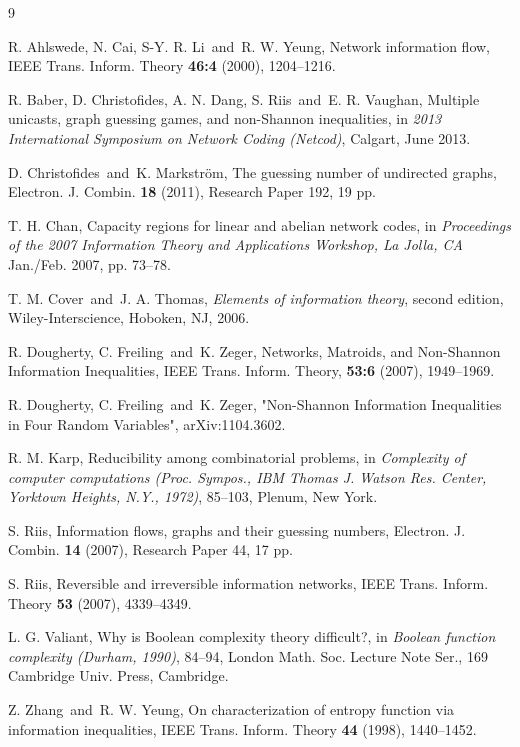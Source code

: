 \documentclass[a4paper, 14pt]{extarticle}
\theoremstyle{plain}
\begin{document}
\begin{thebibliography}{9}


 R. Ahlswede, N. Cai, S-Y. R. Li\ and\ R. W. Yeung, Network information flow, IEEE Trans. Inform. Theory {\bf 46:4} (2000), 1204--1216.

 R. Baber, D. Christofides, A. N. Dang, S. Riis\ and\ E. R. Vaughan, Multiple unicasts, graph guessing games, and non-Shannon inequalities, in {\it 2013 International Symposium on Network Coding (Netcod)}, Calgart, June 2013.

 D. Christofides\ and\ K. Markstr\"om, The guessing number of undirected graphs, Electron. J. Combin. {\bf 18} (2011), Research Paper 192, 19 pp.


 T. H. Chan, Capacity regions for linear and abelian network codes, in {\it Proceedings of the 2007 Information Theory and Applications Workshop, La Jolla, CA} Jan./Feb. 2007, pp. 73--78.


 T. M. Cover\ and\ J. A. Thomas, {\it Elements of information theory}, second edition, Wiley-Interscience, Hoboken, NJ, 2006.

 R. Dougherty, C. Freiling\ and\ K. Zeger, Networks, Matroids, and Non-Shannon Information Inequalities, IEEE Trans. Inform. Theory, {\bf 53:6} (2007), 1949--1969.

 R. Dougherty, C. Freiling\ and\ K. Zeger, "Non-Shannon Information Inequalities in Four Random Variables", arXiv:1104.3602.

 R. M. Karp, Reducibility among combinatorial problems, in {\it Complexity of computer computations (Proc. Sympos., IBM Thomas J. Watson Res. Center, Yorktown Heights, N.Y., 1972)}, 85--103, Plenum, New York.

 S. Riis, Information flows, graphs and their guessing numbers, Electron. J. Combin. {\bf 14} (2007), Research Paper 44, 17 pp.

 S. Riis, Reversible and irreversible information networks, IEEE Trans. Inform. Theory {\bf 53} (2007), 4339--4349.


 L. G. Valiant, Why is Boolean complexity theory difficult?, in {\it Boolean function complexity (Durham, 1990)}, 84--94, London Math. Soc. Lecture Note Ser., 169 Cambridge Univ. Press, Cambridge.

 Z. Zhang\ and\ R. W. Yeung, On characterization of entropy function via information inequalities, IEEE Trans. Inform. Theory {\bf 44} (1998), 1440--1452.


\end{thebibliography}
\end{document}
